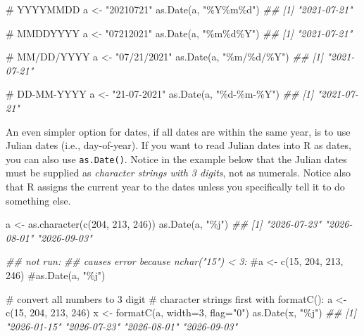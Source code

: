 \documentclass[
  13,
  letterpaper,
]{report}
\newenvironment{Shaded}{\begin{snugshade}}{\end{snugshade}}
\newcommand{\AttributeTok}[1]{\textcolor[rgb]{0.40,0.45,0.13}{#1}}
\newcommand{\CommentTok}[1]{\textcolor[rgb]{0.37,0.37,0.37}{#1}}
\newcommand{\DecValTok}[1]{\textcolor[rgb]{0.68,0.00,0.00}{#1}}
\newcommand{\DocumentationTok}[1]{\textcolor[rgb]{0.37,0.37,0.37}{\textit{#1}}}
\newcommand{\FunctionTok}[1]{\textcolor[rgb]{0.28,0.35,0.67}{#1}}
\newcommand{\NormalTok}[1]{\textcolor[rgb]{0.00,0.23,0.31}{#1}}
\newcommand{\OtherTok}[1]{\textcolor[rgb]{0.00,0.23,0.31}{#1}}
\newcommand{\StringTok}[1]{\textcolor[rgb]{0.13,0.47,0.30}{#1}}
\begin{document}
\begin{Shaded}
\begin{Highlighting}[]

\CommentTok{\# YYYYMMDD}
\NormalTok{a }\OtherTok{\textless{}{-}} \StringTok{"20210721"}
\FunctionTok{as.Date}\NormalTok{(a, }\StringTok{"\%Y\%m\%d"}\NormalTok{)}
\DocumentationTok{\#\# [1] "2021{-}07{-}21"}

\CommentTok{\# MMDDYYYY}
\NormalTok{a }\OtherTok{\textless{}{-}} \StringTok{"07212021"}
\FunctionTok{as.Date}\NormalTok{(a, }\StringTok{"\%m\%d\%Y"}\NormalTok{)}
\DocumentationTok{\#\# [1] "2021{-}07{-}21"}

\CommentTok{\# MM/DD/YYYY}
\NormalTok{a }\OtherTok{\textless{}{-}} \StringTok{"07/21/2021"}
\FunctionTok{as.Date}\NormalTok{(a, }\StringTok{"\%m/\%d/\%Y"}\NormalTok{)}
\DocumentationTok{\#\# [1] "2021{-}07{-}21"}

\CommentTok{\# DD{-}MM{-}YYYY}
\NormalTok{a }\OtherTok{\textless{}{-}} \StringTok{"21{-}07{-}2021"}
\FunctionTok{as.Date}\NormalTok{(a, }\StringTok{"\%d{-}\%m{-}\%Y"}\NormalTok{)}
\DocumentationTok{\#\# [1] "2021{-}07{-}21"}
\end{Highlighting}
\end{Shaded}

An even simpler option for dates, if all dates are within the same year,
is to use Julian dates (i.e., day-of-year). If you want to read Julian
dates into R as dates, you can also use \texttt{as.Date()}. Notice in
the example below that the Julian dates must be supplied as
\emph{character strings with 3 digits}, not as numerals. Notice also
that R assigns the current year to the dates unless you specifically
tell it to do something else.

\begin{Shaded}
\begin{Highlighting}[]

\NormalTok{a }\OtherTok{\textless{}{-}} \FunctionTok{as.character}\NormalTok{(}\FunctionTok{c}\NormalTok{(}\DecValTok{204}\NormalTok{, }\DecValTok{213}\NormalTok{, }\DecValTok{246}\NormalTok{))}
\FunctionTok{as.Date}\NormalTok{(a, }\StringTok{"\%j"}\NormalTok{)}
\DocumentationTok{\#\# [1] "2026{-}07{-}23" "2026{-}08{-}01" "2026{-}09{-}03"}

\DocumentationTok{\#\# not run:}
\DocumentationTok{\#\# causes error because nchar("15") \textless{} 3:}
\CommentTok{\#a \textless{}{-} c(15, 204, 213, 246)}
\CommentTok{\#as.Date(a, "\%j")}

\CommentTok{\# convert all numbers to 3 digit}
\CommentTok{\# character strings first with formatC():}
\NormalTok{a }\OtherTok{\textless{}{-}} \FunctionTok{c}\NormalTok{(}\DecValTok{15}\NormalTok{, }\DecValTok{204}\NormalTok{, }\DecValTok{213}\NormalTok{, }\DecValTok{246}\NormalTok{)}
\NormalTok{x }\OtherTok{\textless{}{-}} \FunctionTok{formatC}\NormalTok{(a, }\AttributeTok{width=}\DecValTok{3}\NormalTok{, }\AttributeTok{flag=}\StringTok{"0"}\NormalTok{)}
\FunctionTok{as.Date}\NormalTok{(x, }\StringTok{"\%j"}\NormalTok{)}
\DocumentationTok{\#\# [1] "2026{-}01{-}15" "2026{-}07{-}23" "2026{-}08{-}01" "2026{-}09{-}03"}
\end{Highlighting}
\end{Shaded}
\end{document}

